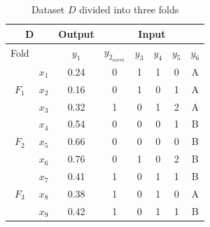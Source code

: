 \documentclass{article}
\begin{document}
\begin{table}[H]
\centering
\begin{tabular}{|cc|c|ccccc|}
\hline
\multicolumn{2}{|c|}{D}                              & Output & \multicolumn{5}{c|}{Input}                                                                                                         \\ \hline
\multicolumn{1}{|c|}{Fold}                   &       & $y_1$  & \multicolumn{1}{c|}{$y_{2_{norm}}$} & \multicolumn{1}{c|}{$y_3$} & \multicolumn{1}{c|}{$y_4$} & \multicolumn{1}{c|}{$y_5$} & $y_6$ \\ \hline
\multicolumn{1}{|c|}{\multirow{3}{*}{$F_1$}} & $x_1$ & 0.24   & \multicolumn{1}{c|}{0}              & \multicolumn{1}{c|}{1}     & \multicolumn{1}{c|}{1}     & \multicolumn{1}{c|}{0}     & A     \\ \cline{2-8} 
\multicolumn{1}{|c|}{}                       & $x_2$ & 0.16   & \multicolumn{1}{c|}{0}              & \multicolumn{1}{c|}{1}     & \multicolumn{1}{c|}{0}     & \multicolumn{1}{c|}{1}     & A     \\ \cline{2-8} 
\multicolumn{1}{|c|}{}                       & $x_3$ & 0.32   & \multicolumn{1}{c|}{1}              & \multicolumn{1}{c|}{0}     & \multicolumn{1}{c|}{1}     & \multicolumn{1}{c|}{2}     & A     \\ \hline
\multicolumn{1}{|c|}{\multirow{3}{*}{$F_2$}} & $x_4$ & 0.54   & \multicolumn{1}{c|}{0}              & \multicolumn{1}{c|}{0}     & \multicolumn{1}{c|}{0}     & \multicolumn{1}{c|}{1}     & B     \\ \cline{2-8} 
\multicolumn{1}{|c|}{}                       & $x_5$ & 0.66   & \multicolumn{1}{c|}{0}              & \multicolumn{1}{c|}{0}     & \multicolumn{1}{c|}{0}     & \multicolumn{1}{c|}{0}     & B     \\ \cline{2-8} 
\multicolumn{1}{|c|}{}                       & $x_6$ & 0.76   & \multicolumn{1}{c|}{0}              & \multicolumn{1}{c|}{1}     & \multicolumn{1}{c|}{0}     & \multicolumn{1}{c|}{2}     & B     \\ \hline
\multicolumn{1}{|c|}{\multirow{3}{*}{$F_3$}} & $x_7$ & 0.41   & \multicolumn{1}{c|}{1}              & \multicolumn{1}{c|}{0}     & \multicolumn{1}{c|}{1}     & \multicolumn{1}{c|}{1}     & B     \\ \cline{2-8} 
\multicolumn{1}{|c|}{}                       & $x_8$ & 0.38   & \multicolumn{1}{c|}{1}              & \multicolumn{1}{c|}{0}     & \multicolumn{1}{c|}{1}     & \multicolumn{1}{c|}{0}     & A     \\ \cline{2-8} 
\multicolumn{1}{|c|}{}                       & $x_9$ & 0.42   & \multicolumn{1}{c|}{1}              & \multicolumn{1}{c|}{0}     & \multicolumn{1}{c|}{1}     & \multicolumn{1}{c|}{1}     & B     \\ \hline
\end{tabular}
\caption{Dataset $D$ divided into three folds}
\label{tab:dataset2folds}
\end{table}
\end{document}
